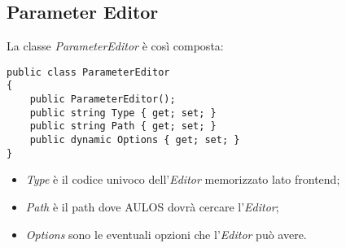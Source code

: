 \subsection{Parameter Editor}
La classe \textit{ParameterEditor} è così composta:
\begin{lstlisting}[caption={ParameterEditor.cs},style=sharpCode]
public class ParameterEditor
{
    public ParameterEditor();
    public string Type { get; set; }
    public string Path { get; set; }
    public dynamic Options { get; set; }
}
\end{lstlisting}
\begin{itemize}
\item \textit{Type} è il codice univoco dell'\textit{Editor} memorizzato lato frontend;
\item \textit{Path} è il path dove AULOS dovrà cercare l'\textit{Editor};
\item \textit{Options} sono le eventuali opzioni che l'\textit{Editor} può avere.
\end{itemize}

